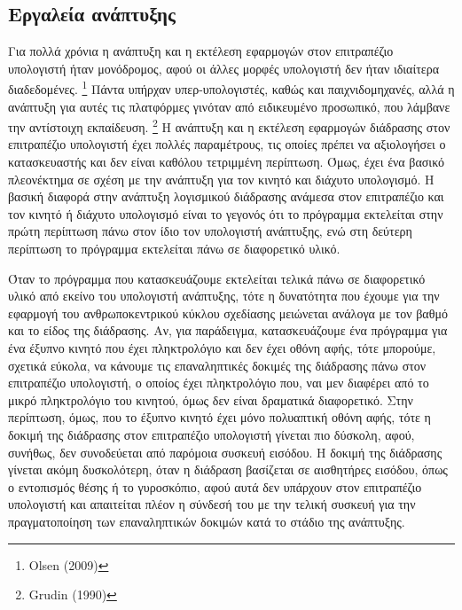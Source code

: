 \documentclass[
]{article}
\begin{document}
\hypertarget{ux3b5ux3c1ux3b3ux3b1ux3bbux3b5ux3afux3b1-ux3b1ux3bdux3acux3c0ux3c4ux3c5ux3beux3b7ux3c2}{%
\subsection{Εργαλεία
ανάπτυξης}\label{ux3b5ux3c1ux3b3ux3b1ux3bbux3b5ux3afux3b1-ux3b1ux3bdux3acux3c0ux3c4ux3c5ux3beux3b7ux3c2}}

Για πολλά χρόνια η ανάπτυξη και η εκτέλεση εφαρμογών στον επιτραπέζιο
υπολογιστή ήταν μονόδρομος, αφού οι άλλες μορφές υπολογιστή δεν ήταν
ιδιαίτερα διαδεδομένες. \footnote{Olsen (2009)} Πάντα υπήρχαν
υπερ-υπολογιστές, καθώς και παιχνιδομηχανές, αλλά η ανάπτυξη για αυτές
τις πλατφόρμες γινόταν από ειδικευμένο προσωπικό, που λάμβανε την
αντίστοιχη εκπαίδευση. \footnote{Grudin (1990)} Η ανάπτυξη και η
εκτέλεση εφαρμογών διάδρασης στον επιτραπέζιο υπολογιστή έχει πολλές
παραμέτρους, τις οποίες πρέπει να αξιολογήσει ο κατασκευαστής και δεν
είναι καθόλου τετριμμένη περίπτωση. Όμως, έχει ένα βασικό πλεονέκτημα σε
σχέση με την ανάπτυξη για τον κινητό και διάχυτο υπολογισμό. Η βασική
διαφορά στην ανάπτυξη λογισμικού διάδρασης ανάμεσα στον επιτραπέζιο και
τον κινητό ή διάχυτο υπολογισμό είναι το γεγονός ότι το πρόγραμμα
εκτελείται στην πρώτη περίπτωση πάνω στον ίδιο τον υπολογιστή ανάπτυξης,
ενώ στη δεύτερη περίπτωση το πρόγραμμα εκτελείται πάνω σε διαφορετικό
υλικό.

Όταν το πρόγραμμα που κατασκευάζουμε εκτελείται τελικά πάνω σε
διαφορετικό υλικό από εκείνο του υπολογιστή ανάπτυξης, τότε η δυνατότητα
που έχουμε για την εφαρμογή του ανθρωποκεντρικού κύκλου σχεδίασης
μειώνεται ανάλογα με τον βαθμό και το είδος της διάδρασης. Αν, για
παράδειγμα, κατασκευάζουμε ένα πρόγραμμα για ένα έξυπνο κινητό που έχει
πληκτρολόγιο και δεν έχει οθόνη αφής, τότε μπορούμε, σχετικά εύκολα, να
κάνουμε τις επαναληπτικές δοκιμές της διάδρασης πάνω στον επιτραπέζιο
υπολογιστή, ο οποίος έχει πληκτρολόγιο που, ναι μεν διαφέρει από το
μικρό πληκτρολόγιο του κινητού, όμως δεν είναι δραματικά διαφορετικό.
Στην περίπτωση, όμως, που το έξυπνο κινητό έχει μόνο πολυαπτική οθόνη
αφής, τότε η δοκιμή της διάδρασης στον επιτραπέζιο υπολογιστή γίνεται
πιο δύσκολη, αφού, συνήθως, δεν συνοδεύεται από παρόμοια συσκευή
εισόδου. Η δοκιμή της διάδρασης γίνεται ακόμη δυσκολότερη, όταν η
διάδραση βασίζεται σε αισθητήρες εισόδου, όπως ο εντοπισμός θέσης ή το
γυροσκόπιο, αφού αυτά δεν υπάρχουν στον επιτραπέζιο υπολογιστή και
απαιτείται πλέον η σύνδεσή του με την τελική συσκευή για την
πραγματοποίηση των επαναληπτικών δοκιμών κατά το στάδιο της ανάπτυξης.
\end{document}
